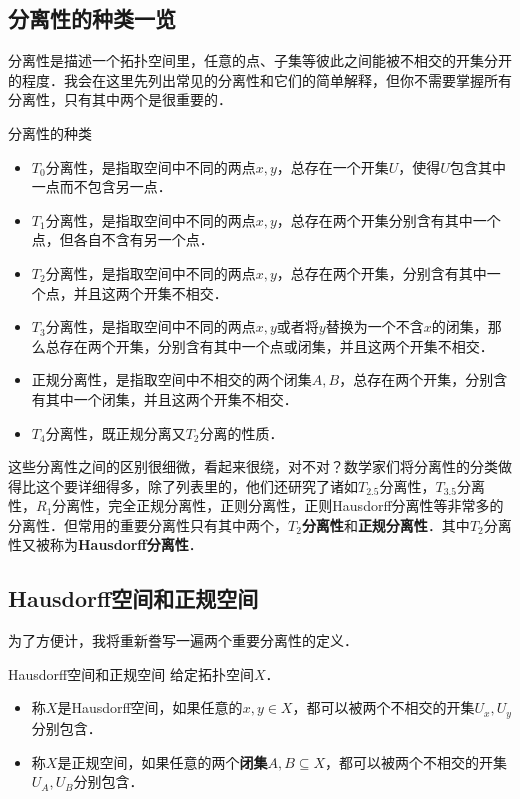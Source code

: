 
\subsection{分离性的种类一览}

分离性是描述一个拓扑空间里，任意的点、子集等彼此之间能被不相交的开集分开的程度．我会在这里先列出常见的分离性和它们的简单解释，但你不需要掌握所有分离性，只有其中两个是很重要的．

\begin{definition}{分离性的种类}
\begin{itemize}

\item $T_0$分离性，是指取空间中不同的两点$x,y$，总存在一个开集$U$，使得$U$包含其中一点而不包含另一点．
\item $T_1$分离性，是指取空间中不同的两点$x,y$，总存在两个开集分别含有其中一个点，但各自不含有另一个点．
\item $T_2$分离性，是指取空间中不同的两点$x,y$，总存在两个开集，分别含有其中一个点，并且这两个开集不相交．
\item $T_3$分离性，是指取空间中不同的两点$x,y$或者将$y$替换为一个不含$x$的闭集，那么总存在两个开集，分别含有其中一个点或闭集，并且这两个开集不相交．
\item 正规分离性，是指取空间中不相交的两个闭集$A, B$，总存在两个开集，分别含有其中一个闭集，并且这两个开集不相交．
\item $T_4$分离性，既正规分离又$T_2$分离的性质．


\end{itemize}
\end{definition}

这些分离性之间的区别很细微，看起来很绕，对不对？数学家们将分离性的分类做得比这个要详细得多，除了列表里的，他们还研究了诸如$T_{2.5}$分离性，$T_{3.5}$分离性，$R_1$分离性，完全正规分离性，正则分离性，正则Hausdorff分离性等非常多的分离性．但常用的重要分离性只有其中两个，\textbf{$T_2$分离性}和\textbf{正规分离性}．其中$T_2$分离性又被称为\textbf{Hausdorff分离性}．

\subsection{Hausdorff空间和正规空间}

为了方便计，我将重新誊写一遍两个重要分离性的定义．

\begin{definition}{Hausdorff空间和正规空间}
给定拓扑空间$X$．
\begin{itemize}
\item 称$X$是Hausdorff空间，如果任意的$x,y\in X$，都可以被两个不相交的开集$U_x, U_y$分别包含．
\item 称$X$是正规空间，如果任意的两个\textbf{闭集}$A, B\subseteq X$，都可以被两个不相交的开集$U_A, U_B$分别包含．
\end{itemize}
\end{definition}


